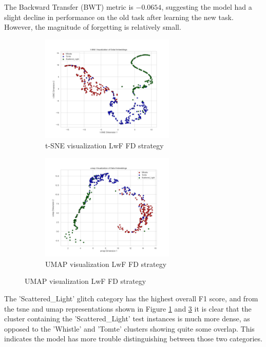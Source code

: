 The Backward Transfer (BWT) metric is $-0.0654$, suggesting the model had a slight decline in performance on the old task after learning the new task. However, the magnitude of forgetting is relatively small. \\

\begin{figure}[ht]
\centering
\begin{subfigure}
  \centering
    \includegraphics[width=0.7\textwidth]{Images/tSNE_FractalDimension_LwF_test.png}
    \caption{t-SNE visualization LwF FD strategy}
    \label{fig:tSNE_FD_LwF}
\end{subfigure}
\begin{subfigure}
  \centering
    \includegraphics[width=0.7\textwidth]{Images/umap_FractalDimension_LwF_test.png}
    \caption{UMAP visualization LwF FD strategy}
    \label{fig:umap_FD_LwF}
\end{subfigure}
\end{figure}

The 'Scattered\_Light' glitch category has the highest overall F1 score, and from the \acrshort{tsne} and \acrshort{umap} representations shown in Figure \ref{fig:tSNE_FD_LwF} and \ref{fig:umap_FD_LwF} it is clear that the cluster containing the 'Scattered\_Light' test instances is much more dense, as opposed to the 'Whistle' and 'Tomte' clusters showing quite some overlap. This indicates the model has more trouble distinguishing between those two categories. 

